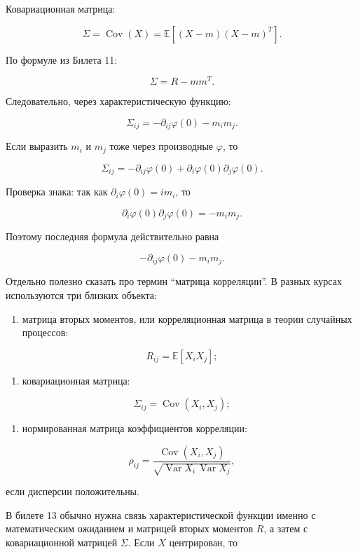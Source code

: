 \documentclass[
  11pt,
  a4paper,
]{article}
\providecommand{\tightlist}{%
  \setlength{\itemsep}{0pt}\setlength{\parskip}{0pt}}
\begin{document}
Ковариационная матрица:

\[
\Sigma
=
\operatorname{Cov}(X)
=
\mathbb E[(X-m)(X-m)^T].
\]

По формуле из Билета 11:

\[
\Sigma=R-mm^T.
\]

Следовательно, через характеристическую функцию:

\[
\Sigma_{ij}
=
-\partial_{ij}\varphi(0)-m_im_j.
\]

Если выразить \(m_i\) и \(m_j\) тоже через производные \(\varphi\), то

\[
\Sigma_{ij}
=
-\partial_{ij}\varphi(0)
+\partial_i\varphi(0)\partial_j\varphi(0).
\]

Проверка знака: так как \(\partial_i\varphi(0)=im_i\), то

\[
\partial_i\varphi(0)\partial_j\varphi(0)
=
-m_im_j.
\]

Поэтому последняя формула действительно равна

\[
-\partial_{ij}\varphi(0)-m_im_j.
\]

Отдельно полезно сказать про термин ``матрица корреляции''. В разных
курсах используются три близких объекта:

\begin{enumerate}
\def\labelenumi{\arabic{enumi}.}
\tightlist
\item
  матрица вторых моментов, или корреляционная матрица в теории случайных
  процессов:
\end{enumerate}

\[
R_{ij}=\mathbb E[X_iX_j];
\]

\begin{enumerate}
\def\labelenumi{\arabic{enumi}.}
\setcounter{enumi}{1}
\tightlist
\item
  ковариационная матрица:
\end{enumerate}

\[
\Sigma_{ij}=\operatorname{Cov}(X_i,X_j);
\]

\begin{enumerate}
\def\labelenumi{\arabic{enumi}.}
\setcounter{enumi}{2}
\tightlist
\item
  нормированная матрица коэффициентов корреляции:
\end{enumerate}

\[
\rho_{ij}
=
\frac{\operatorname{Cov}(X_i,X_j)}
{\sqrt{\operatorname{Var}X_i\,\operatorname{Var}X_j}},
\]

если дисперсии положительны.

В билете 13 обычно нужна связь характеристической функции именно с
математическим ожиданием и матрицей вторых моментов \(R\), а затем с
ковариационной матрицей \(\Sigma\). Если \(X\) центрирован, то
\end{document}
